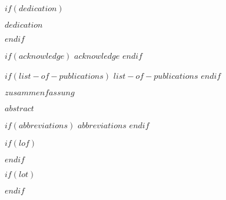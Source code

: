 \documentclass[a4paper,11pt]{article}
\begin{document}
$if(dedication)$
\null
\vspace{5cm}
\begin{center}
\textit{$dedication$}
\end{center}
\newpage\null\thispagestyle{empty}\newpage
$endif$


$if(acknowledge)$
\newpage
$acknowledge$
$endif$
\pagestyle{plain}
\setcounter{page}{1}    %
\newpage\null\thispagestyle{empty}\newpage


$if(list-of-publications)$
$list-of-publications$
\newpage\null\thispagestyle{empty}\newpage
$endif$


$zusammenfassung$
\newpage\null\thispagestyle{empty}\newpage


$abstract$
\newpage\null\thispagestyle{empty}\newpage

\newpage
\tableofcontents
\clearpage

$if(abbreviations)$
\newpage
$abbreviations$
$endif$

$if(lof)$
\newpage
\listoffigures
{}
$endif$

$if(lot)$
\newpage
\listoftables
{}
$endif$
\end{document}
